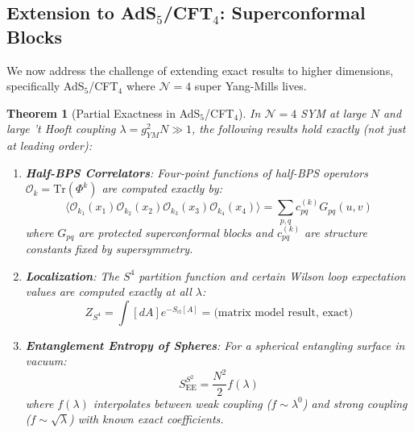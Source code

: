 \documentclass[12pt,a4paper]{article}
\newtheorem{theorem}{Theorem}[section]
\begin{document}
\subsection{Extension to AdS$_5$/CFT$_4$: Superconformal Blocks}

We now address the challenge of extending exact results to higher dimensions, specifically AdS$_5$/CFT$_4$ where $\mathcal{N}=4$ super Yang-Mills lives.

\begin{theorem}[Partial Exactness in AdS$_5$/CFT$_4$]\label{thm:ads5-partial}
In $\mathcal{N}=4$ SYM at large $N$ and large 't Hooft coupling $\lambda = g_{YM}^2 N \gg 1$, the following results hold \emph{exactly} (not just at leading order):

\begin{enumerate}
    \item \textbf{Half-BPS Correlators}: Four-point functions of half-BPS operators $\mathcal{O}_k = \text{Tr}(\Phi^k)$ are computed exactly by:
    \begin{equation}
    \langle \mathcal{O}_{k_1}(x_1) \mathcal{O}_{k_2}(x_2) \mathcal{O}_{k_3}(x_3) \mathcal{O}_{k_4}(x_4) \rangle = \sum_{p,q} c_{pq}^{(k)} G_{pq}(u,v)
    \end{equation}
    where $G_{pq}$ are protected superconformal blocks and $c_{pq}^{(k)}$ are structure constants fixed by supersymmetry.
    
    \item \textbf{Localization}: The $S^4$ partition function and certain Wilson loop expectation values are computed \emph{exactly} at all $\lambda$:
    \begin{equation}
    Z_{S^4} = \int [dA] e^{-S_{\text{cl}}[A]} = \text{(matrix model result, exact)}
    \end{equation}
    
    \item \textbf{Entanglement Entropy of Spheres}: For a spherical entangling surface in vacuum:
    \begin{equation}
    S_{\text{EE}}^{S^2} = \frac{N^2}{2} f(\lambda)
    \end{equation}
    where $f(\lambda)$ interpolates between weak coupling ($f \sim \lambda^0$) and strong coupling ($f \sim \sqrt{\lambda}$) with known exact coefficients.
\end{enumerate}
\end{theorem}
\end{document}
